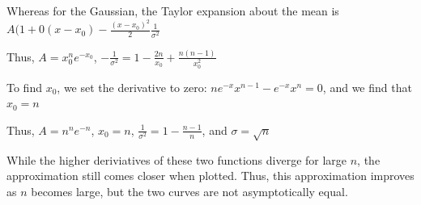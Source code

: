 \documentclass[12pt]{article}
\begin{document}
Whereas for the Gaussian, the Taylor expansion about the mean is $A(1 + 0(x-x_0) - \frac{(x-x_0)^2}{2}\frac{1}{ \sigma ^2}$

Thus, $A = x_0^ne^{-x_0}$, $-\frac{1}{ \sigma ^2} = 1 - \frac{2n}{x_0} + \frac{n(n-1)}{x_0^2}$


To find $x_0$, we set the derivative to zero: $n e^{-x} x^{n-1}-e^{-x} x^n = 0$, and we find that $x_0 = n$

Thus, $\boxed{A=n^ne^{-n}}$, $\boxed{x_0 = n}$, $\frac{1}{\sigma^2} = 1-\frac{n-1}{n}$, and $\boxed{\sigma = \sqrt{n}}$

While the higher deriviatives of these two functions diverge for large $n$, the approximation still comes closer when plotted. Thus, this approximation improves as $n$ becomes large, but the two curves are not asymptotically equal.
\end{document}
